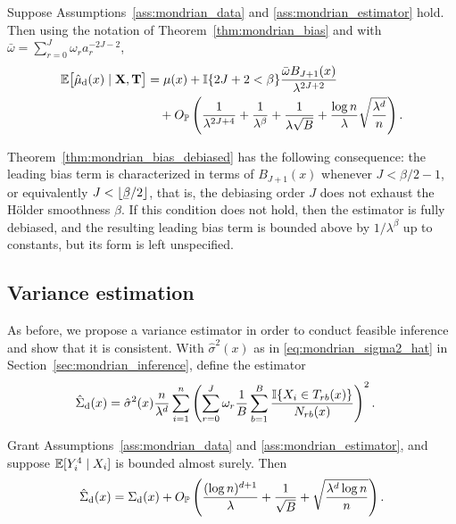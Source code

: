 \begin{theorem}%
  \label{thm:mondrian_bias_debiased}
  Suppose Assumptions~\ref{ass:mondrian_data} and \ref{ass:mondrian_estimator}
  hold.
  Then using the notation of Theorem~\ref{thm:mondrian_bias} and with
  $\bar\omega = \sum_{r=0}^J \omega_r a_r^{-2J - 2}$,
  \begin{align*}
    \mathbb{E} \big[ \hat \mu_{\mathrm{d}}(x) \mid \mathbf{X}, \mathbf{T} \big]
    &= \mu(x) + \mathbb{I}\{2J+2 < \beta \}
    \frac{\bar\omega B_{J+1}(x)}{\lambda^{2J + 2}} \\
    &\quad+
    O_{\mathbb{P}} \left(
      \frac{1}{\lambda^{2J + 4}}
      + \frac{1}{\lambda^\beta}
      + \frac{1}{\lambda \sqrt B}
      + \frac{\log n}{\lambda} \sqrt{\frac{\lambda^d}{n}}
    \right).
  \end{align*}
\end{theorem}

Theorem~\ref{thm:mondrian_bias_debiased} has the following consequence:
the leading bias term is characterized in terms of
$B_{J+1}(x)$ whenever $J < \beta/2 - 1$,
or equivalently $J < \lfloor \flbeta/2 \rfloor$,
that is, the debiasing order
$J$ does not exhaust the H{\"o}lder smoothness $\beta$.
If this condition does not hold, then the estimator is
fully debiased, and the resulting leading bias
term is bounded above by $1/\lambda^\beta$ up to constants,
but its form is left unspecified.

\subsection*{Variance estimation}

As before, we propose a variance estimator in order to conduct feasible
inference and show that it is consistent.
With $\hat\sigma^2(x)$ as in \eqref{eq:mondrian_sigma2_hat}
in Section~\ref{sec:mondrian_inference}, define the estimator
%
\begin{align}
  \label{eq:mondrian_debiased_variance_estimator}
  \hat\Sigma_{\mathrm{d}}(x)
  &=
  \hat\sigma^2(x)
  \frac{n}{\lambda^d}
  \sum_{i=1}^n
  \left(
    \sum_{r=0}^J
    \omega_r
    \frac{1}{B}
    \sum_{b=1}^B
    \frac{\mathbb{I}\{X_i \in T_{r b}(x)\}}
    {N_{r b}(x)}
  \right)^2.
\end{align}
%
\begin{theorem}%
  \label{thm:mondrian_variance_estimation_debiased}
  Grant Assumptions~\ref{ass:mondrian_data} and \ref{ass:mondrian_estimator},
  and
  suppose $\mathbb{E}[Y_i^4 \mid X_i ]$ is bounded almost surely. Then
  \begin{align*}
    \hat\Sigma_{\mathrm{d}}(x)
    = \Sigma_{\mathrm{d}}(x)
    + O_{\mathbb{P}} \left(
      \frac{(\log n)^{d+1}}{\lambda}
      + \frac{1}{\sqrt B}
      + \sqrt{\frac{\lambda^d \log n}{n}}
    \right).
  \end{align*}
\end{theorem}

